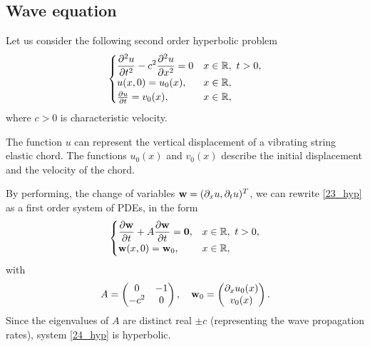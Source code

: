 \subsection{Wave equation}
Let us consider the following second order hyperbolic problem 
\begin{equation}
    \begin{cases}
        \displaystyle\partialderivative{^2 u}{t^2} - c^2 \partialderivative{^2 u}{x^2} = 0 & x \in \real, \ t > 0, \\
        u(x, 0) = u_0 (x), & x \in \real, \\
        \partialderivative{u}{t}(x,0) = v_0(x), & x \in \real,
    \end{cases}
    \label{23_hyp}
\end{equation}
where \(c > 0\) is characteristic velocity. 

The function \(u\) can represent the vertical displacement of a vibrating string elastic chord. The functions \(u_0(x)\) and \(v_0(x)\) describe the initial displacement and the velocity of the chord. 

By performing, the change of variables \(\textbf{w} = (\partial_x u, \partial_t u)^T\), we can rewrite \eqref{23_hyp} as a first order system of PDEs, in the form 
\begin{equation}
    \begin{cases}
        \displaystyle \partialderivative{\vect{w}}{t} + A \partialderivative{\vect{w}}{t} = \vect{0}, & x \in \real, \ t> 0,\\
        \vect{w}(x,0) = \vect{w}_0, & x \in \real,
    \end{cases}
    \label{24_hyp}
\end{equation}
with 
\[
    A = \left( \begin{matrix}
        0 & -1 \\
        -c^2 & 0
    \end{matrix} \right), \quad \textbf{w}_0 = \left( \begin{matrix}
        \partial_x u_0(x) \\
        v_0(x)
    \end{matrix} \right).
\]
Since the eigenvalues of \(A\) are distinct real \(\pm c\) (representing the wave propagation rates), system \eqref{24_hyp} is hyperbolic.
